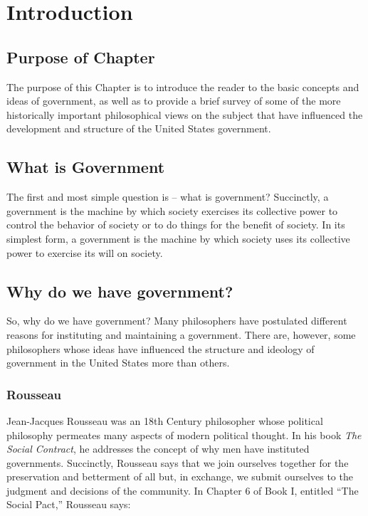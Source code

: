 %
%
%
%
%
%

\chapter{Introduction}

\section{Purpose of Chapter}
The purpose of this Chapter is to introduce the reader to the basic concepts and ideas of government, as well as to provide a brief survey of some of the more historically important philosophical views on the subject that have influenced the development and structure of the United States government.

\section{What is Government}
The first and most simple question is -- what is government?  Succinctly, a government is the machine by which society exercises its collective power to control the behavior of society or to do things for the benefit of society.  In its simplest form, a government is the machine by which society uses its collective power to exercise its will on society.

\section{Why do we have government?}
So, why do we have government?  Many philosophers have postulated different reasons for instituting and maintaining a government.  There are, however, some philosophers whose ideas have influenced the structure and ideology of government in the United States more than others.

\subsection{Rousseau}
Jean-Jacques Rousseau was an 18th Century philosopher whose political philosophy permeates many aspects of modern political thought.  In his book \textit{The Social Contract}, he addresses the concept of why men have instituted governments.  Succinctly, Rousseau says that we join ourselves together for the preservation and betterment of all but, in exchange, we submit ourselves to the judgment and decisions of the community.
In Chapter 6 of Book I, entitled ``The Social Pact,'' Rousseau says:

